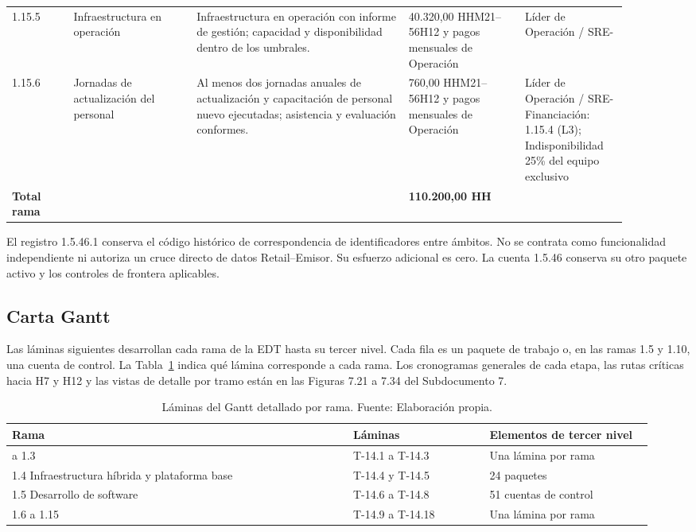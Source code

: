\documentclass[11pt]{article}
\begin{document}
\begin{longtable}{@{}p{0.09\linewidth}p{0.18\linewidth}p{0.31\linewidth}p{0.17\linewidth}p{0.15\linewidth}@{}}
1.15.5 & Infraestructura en operación & Infraestructura en operación con informe de gestión; capacidad y disponibilidad dentro de los umbrales. & 40.320,00 HH\newline M21--56\newline H12 y pagos mensuales de Operación & Líder de Operación / SRE\newline - \\
1.15.6 & Jornadas de actualización del personal & Al menos dos jornadas anuales de actualización y capacitación de personal nuevo ejecutadas; asistencia y evaluación conformes. & 760,00 HH\newline M21--56\newline H12 y pagos mensuales de Operación & Líder de Operación / SRE\newline -\newline Financiación: 1.15.4 (L3); Indisponibilidad 25\% del equipo exclusivo \\
\textbf{Total rama} &  &  & \textbf{110.200,00 HH} &  \\
\end{longtable}
\endgroup
El registro 1.5.46.1 conserva el código histórico de correspondencia de identificadores entre ámbitos. No se contrata como funcionalidad independiente ni autoriza un cruce directo de datos Retail--Emisor. Su esfuerzo adicional es cero. La cuenta 1.5.46 conserva su otro paquete activo y los controles de frontera aplicables.

\subsection{Carta Gantt}

Las láminas siguientes desarrollan cada rama de la EDT hasta su tercer nivel. Cada fila es un paquete de trabajo o, en las ramas 1.5 y 1.10, una cuenta de control. La Tabla~\ref{tab:t14-laminas} indica qué lámina corresponde a cada rama. Los cronogramas generales de cada etapa, las rutas críticas hacia H7 y H12 y las vistas de detalle por tramo están en las Figuras 7.21 a 7.34 del Subdocumento 7.

\begingroup
\small
\begin{longtable}{@{}p{0.5\linewidth}p{0.2\linewidth}p{0.24\linewidth}@{}}
\caption[Láminas del Gantt detallado por rama]{Láminas del Gantt detallado por rama. Fuente: Elaboración propia.}\label{tab:t14-laminas}\\
\toprule
\textbf{Rama} & \textbf{Láminas} & \textbf{Elementos de tercer nivel} \\
\midrule
\endhead
\bottomrule
\endlastfoot
1.1 a 1.3 & T-14.1 a T-14.3 & Una lámina por rama \\
1.4 Infraestructura híbrida y plataforma base & T-14.4 y T-14.5 & 24 paquetes \\
1.5 Desarrollo de software & T-14.6 a T-14.8 & 51 cuentas de control \\
1.6 a 1.15 & T-14.9 a T-14.18 & Una lámina por rama \\
\end{longtable}
\endgroup
\end{document}
